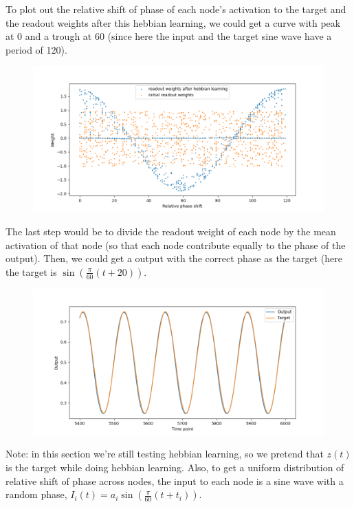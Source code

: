 \documentclass[12pt, a4paper]{article}
\begin{document}
To plot out the relative shift of phase of each node's activation to the target and the readout weights after this hebbian learning, we could get a curve with peak at 0 and a trough at 60 (since here the input and the target sine wave have a period of 120). 

\begin{figure}[H]
    \centering
    \includegraphics[width=\textwidth]{RNN/FORCE/fig/FORCE_phase_outweights.png}
\end{figure}

The last step would be to divide the readout weight of each node by the mean activation of that node (so that each node contribute equally to the phase of the output). Then, we could get a output with the correct phase as the target (here the target is $\sin(\frac{\pi}{60}(t+20))$.

\begin{figure}[H]
    \centering
    \includegraphics[width=\textwidth]{RNN/FORCE/fig/FORCE_phase_output.png}
\end{figure}

Note: in this section we're still testing hebbian learning, so we pretend that $z(t)$ is the target while doing hebbian learning. Also, to get a uniform distribution of relative shift of phase across nodes, the input to each node is a sine wave with a random phase, $I_i(t) = a_i \sin(\frac{\pi}{60}(t+t_i))$. 
\end{document}
